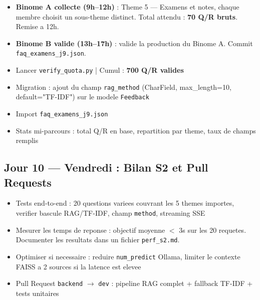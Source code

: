 \documentclass[11pt,a4paper]{article}
\begin{document}
\begin{databox}[Data --- J9]
\begin{itemize}
    \item[$\square$] \textbf{Binome A collecte (9h--12h)} : Theme 5 --- Examens et notes, chaque membre choisit un sous-theme distinct. Total attendu : \textbf{70 Q/R bruts}. Remise a 12h.
    \item[$\square$] \textbf{Binome B valide (13h--17h)} : valide la production du Binome A. Commit \texttt{faq\_examens\_j9.json}.
    \item[$\square$] Lancer \texttt{verify\_quota.py} | Cumul : \textbf{700 Q/R valides}
\end{itemize}
\end{databox}

\begin{dbbox}
\begin{itemize}
    \item[$\square$] Migration : ajout du champ \texttt{rag\_method} (CharField, max\_length=10, default="TF-IDF") sur le modele \texttt{Feedback}
    \item[$\square$] Import \texttt{faq\_examens\_j9.json}
    \item[$\square$] Stats mi-parcours : total Q/R en base, repartition par theme, taux de champs remplis
\end{itemize}
\end{dbbox}

\subsection{Jour 10 --- Vendredi : Bilan S2 et Pull Requests}

\begin{ragbox}[Backend --- J10]
\begin{itemize}
    \item[$\square$] Tests end-to-end : 20 questions variees couvrant les 5 themes importes, verifier bascule RAG/TF-IDF, champ \texttt{method}, streaming SSE
    \item[$\square$] Mesurer les temps de reponse : objectif moyenne $<$ 3s sur les 20 requetes. Documenter les resultats dans un fichier \texttt{perf\_s2.md}.
    \item[$\square$] Optimiser si necessaire : reduire \texttt{num\_predict} Ollama, limiter le contexte FAISS a 2 sources si la latence est elevee
    \item[$\square$] Pull Request \texttt{backend} $\rightarrow$ \texttt{dev} : pipeline RAG complet + fallback TF-IDF + tests unitaires
\end{itemize}
\end{ragbox}
\end{document}
